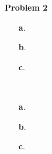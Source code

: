 \textbf{Problem 2}
\begin{itemize}
 \item[\textbf{a}.]
 \item[\textbf{b}.] 
 \item[\textbf{c}.]
 \end{itemize}
\begin{solution}\ 

\begin{itemize}
 \item[\textbf{a}.] 
 
 \item[\textbf{b}.] 
 \item[\textbf{c}.]
 \end{itemize}
 
\end{solution}